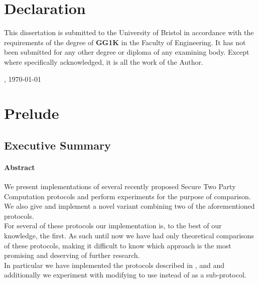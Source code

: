 \documentclass[ %
                    author={Nicholas Tutte},
                supervisor={Prof. Nigel Smart},
                    degree={MEng},
                     title={Secure Two Party Computation},
                  subtitle={A practical comparison of recent protocols},
                      type={Research - GG1K},
                      year={2015} ]{dissertation}
\begin{document}
	\maketitle
	
	\chapter*{Declaration}

		This dissertation is submitted to the University of Bristol in accordance 
		with the requirements of the degree of \textbf{GG1K} in the Faculty 
		of Engineering.  It has not been submitted for any other degree or diploma 
		of any examining body.  Except where specifically acknowledged, it is all 
		the work of the Author. 

		\vspace{6cm}

		, \today


	\chapter*{Prelude}
		\section*{Executive Summary}
			\subsubsection*{Abstract}
			  We present implementations of several recently proposed Secure Two Party Computation protocols and perform experiments for the purpose of comparison. We also give and implement a novel variant combining two of the aforementioned protocols.\\

			  For several of these protocols our implementation is, to the best of our knowledge, the first. As such until now we have had only theoretical comparisons of these protocols, making it difficult to know which approach is the most promising and deserving of further research.\\

			  In particular we have implemented the protocols described in \cite{LindellAndPinkas2011}, \cite{Lindell_CnC_2013} and \cite{Katz_Symm_CnC_2013} and additionally we experiment with modifying \cite{Lindell_CnC_2013} to use \cite{Katz_Symm_CnC_2013} instead of \cite{LindellAndPinkas2011} as a sub-protocol.\\
\end{document}
